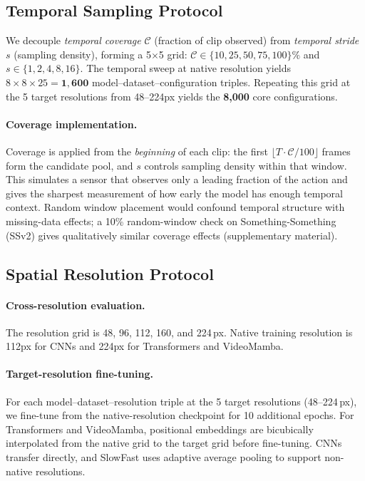 \documentclass[runningheads]{llncs}
\begin{document}
\subsection{Temporal Sampling Protocol}

We decouple \textit{temporal coverage} $\mathcal{C}$ (fraction of clip observed) from \textit{temporal stride} $s$ (sampling density), forming a 5$\times$5 grid: $\mathcal{C}\in\{10,25,50,75,100\}\%$ and $s\in\{1,2,4,8,16\}$. The temporal sweep at native resolution yields $8{\times}8{\times}25{=}\mathbf{1{,}600}$ model--dataset--configuration triples. Repeating this grid at the 5 target resolutions from 48--224px yields the \textbf{8,000} core configurations.

\paragraph{Coverage implementation.}
Coverage is applied from the \emph{beginning} of each clip: the first $\lfloor T\cdot\mathcal{C}/100\rfloor$ frames form the candidate pool, and $s$ controls sampling density within that window. This simulates a sensor that observes only a leading fraction of the action and gives the sharpest measurement of how early the model has enough temporal context. Random window placement would confound temporal structure with missing-data effects; a 10\% random-window check on Something-Something (SSv2) gives qualitatively similar coverage effects (supplementary material).

\subsection{Spatial Resolution Protocol}

\paragraph{Cross-resolution evaluation.}
The resolution grid is 48, 96, 112, 160, and 224\,px. Native training resolution is 112px for CNNs and 224px for Transformers and VideoMamba.

\paragraph{Target-resolution fine-tuning.}
For each model--dataset--resolution triple at the 5 target resolutions (48--224\,px), we fine-tune from the native-resolution checkpoint for 10 additional epochs. For Transformers and VideoMamba, positional embeddings are bicubically interpolated from the native grid to the target grid before fine-tuning. CNNs transfer directly, and SlowFast uses adaptive average pooling to support non-native resolutions.
\end{document}
